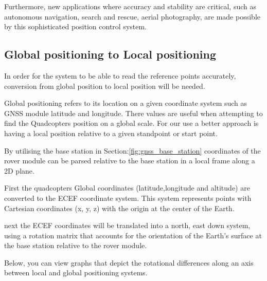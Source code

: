 \documentclass{report}
\begin{document}
Furthermore, new applications where accuracy and stability are critical, such as
autonomous navigation, search and rescue, aerial photography, are made possible
by this sophisticated position control system.

\subsection{Global positioning to Local positioning}\label{gp_vs_lp}
In order for the system to be able to read the reference points accurately, conversion from global position to local position will be needed.

Global positioning refers to its location on a given coordinate system such as GNSS module latitude and longitude. There values are useful when attempting to find the Quadcopters position on a global scale. For our use a better approach is having a local position relative to a given standpoint or start point.

By utilising the base station in Section:\ref{fig:gnss_base_station} coordinates of the rover module can be parsed relative to the base station in a local frame along a 2D plane.

First the quadcopters Global coordinates (latitude,longitude and altitude) are converted to the ECEF coordinate system. This system represents points with Cartesian coordinates (x, y, z) with the origin at the center of the Earth.

next the ECEF coordinates will be translated into a north, east down system, using a rotation matrix that accounts for the orientation of the Earth's surface at the base station relative to the rover module. 

Below, you can view graphs that depict the rotational differences along an axis between local and global positioning systems.
\end{document}

